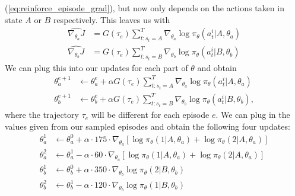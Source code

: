 \documentclass{article}
\begin{document}
\begin{enumerate}
\begin{enumerate}
		            (\ref{eq:reinforce_episode_grad}), but now only depends on the actions taken in
		            state $A$ or $B$ respectively. This leaves us with
		            \begin{align}
			            \widehat{\nabla_{\theta_a} J} & = G(\tau_e) \sum_{t : s_t = A}^T\nabla_{\theta_a}
			            \log \pi_\theta(a_t^i| A, \theta_a)                                               \\
			            \widehat{\nabla_{\theta_b} J} & = G(\tau_e) \sum_{t : s_t = B}^T\nabla_{\theta_b}
			            \log \pi_\theta(a_t^i| B, \theta_b)
		            \end{align}
		            We can plug this into our updates for each part of $\theta$ and obtain
		            \begin{align}
			            \theta^{e+1}_a & \leftarrow \theta^e_a + \alpha G(\tau_e) \sum_{t : s_t
				            = A}^T\nabla_{\theta_a} \log \pi_\theta(a_t^i| A, \theta_a)
			            \label{eq:reinforce_a_update}                                           \\
			            \theta^{e+1}_b & \leftarrow \theta^e_b + \alpha G(\tau_e) \sum_{t : s_t
				            = B}^T\nabla_{\theta_b} \log \pi_\theta(a_t^i| B,
			            \theta_b),\label{eq:reinforce_b_update}
		            \end{align}
		            where the trajectory $\tau_e$ will be different for each episode $e$. We can plug in the
		            values given from our sampled episodes and obtain the following four updates:
		            \begin{align}
			            \theta^1_a & \leftarrow \theta^0_a + \alpha \cdot 175 \cdot
			            \nabla_{\theta_a}\left[ \log \pi_\theta(1| A, \theta_a) + \log \pi_\theta(2|
			            A, \theta_a)\right]                                         \\
			            \theta^2_a & \leftarrow \theta^1_a - \alpha \cdot 60 \cdot
			            \nabla_{\theta_a}\left[ \log \pi_\theta(1| A, \theta_a) + \log \pi_\theta(2|
			            A, \theta_a)\right]                                         \\
			            \theta^1_b & \leftarrow \theta^0_b + \alpha \cdot 350 \cdot
			            \nabla_{\theta_b} \log \pi_\theta(2| B, \theta_b)           \\
			            \theta^2_b & \leftarrow \theta^1_b - \alpha \cdot 120 \cdot
			            \nabla_{\theta_b} \log \pi_\theta(1| B, \theta_b)
		            \end{align}

\end{enumerate}
\end{enumerate}
\end{document}
